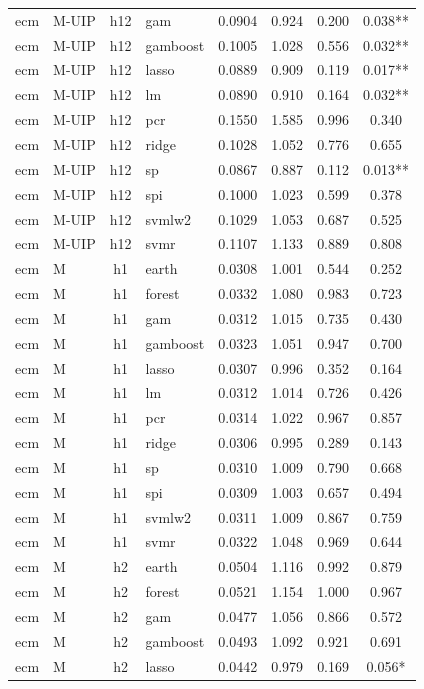 \begin{ThreePartTable}
\begin{longtable}[t]{llclcccc}
ecm & M-UIP & h12 & gam & 0.0904 & 0.924 & 0.200 & 0.038**\\
ecm & M-UIP & h12 & gamboost & 0.1005 & 1.028 & 0.556 & 0.032**\\
ecm & M-UIP & h12 & lasso & 0.0889 & 0.909 & 0.119 & 0.017**\\
ecm & M-UIP & h12 & lm & 0.0890 & 0.910 & 0.164 & 0.032**\\
ecm & M-UIP & h12 & pcr & 0.1550 & 1.585 & 0.996 & 0.340\\
ecm & M-UIP & h12 & ridge & 0.1028 & 1.052 & 0.776 & 0.655\\
ecm & M-UIP & h12 & sp & 0.0867 & 0.887 & 0.112 & 0.013**\\
ecm & M-UIP & h12 & spi & 0.1000 & 1.023 & 0.599 & 0.378\\
ecm & M-UIP & h12 & svmlw2 & 0.1029 & 1.053 & 0.687 & 0.525\\
ecm & M-UIP & h12 & svmr & 0.1107 & 1.133 & 0.889 & 0.808\\
\addlinespace
ecm & M & h1 & earth & 0.0308 & 1.001 & 0.544 & 0.252\\
ecm & M & h1 & forest & 0.0332 & 1.080 & 0.983 & 0.723\\
ecm & M & h1 & gam & 0.0312 & 1.015 & 0.735 & 0.430\\
ecm & M & h1 & gamboost & 0.0323 & 1.051 & 0.947 & 0.700\\
ecm & M & h1 & lasso & 0.0307 & 0.996 & 0.352 & 0.164\\
ecm & M & h1 & lm & 0.0312 & 1.014 & 0.726 & 0.426\\
ecm & M & h1 & pcr & 0.0314 & 1.022 & 0.967 & 0.857\\
ecm & M & h1 & ridge & 0.0306 & 0.995 & 0.289 & 0.143\\
ecm & M & h1 & sp & 0.0310 & 1.009 & 0.790 & 0.668\\
ecm & M & h1 & spi & 0.0309 & 1.003 & 0.657 & 0.494\\
ecm & M & h1 & svmlw2 & 0.0311 & 1.009 & 0.867 & 0.759\\
ecm & M & h1 & svmr & 0.0322 & 1.048 & 0.969 & 0.644\\
\addlinespace
ecm & M & h2 & earth & 0.0504 & 1.116 & 0.992 & 0.879\\
ecm & M & h2 & forest & 0.0521 & 1.154 & 1.000 & 0.967\\
ecm & M & h2 & gam & 0.0477 & 1.056 & 0.866 & 0.572\\
ecm & M & h2 & gamboost & 0.0493 & 1.092 & 0.921 & 0.691\\
ecm & M & h2 & lasso & 0.0442 & 0.979 & 0.169 & 0.056*\\

\end{longtable}
\end{ThreePartTable}
